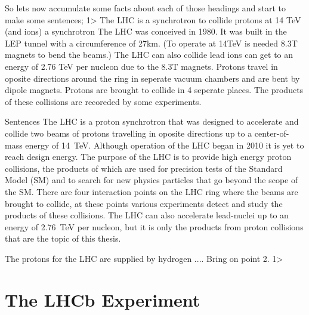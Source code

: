 So lets now accumulate some facts about each of those headings and start to make some sentences;
1> The LHC is a synchrotron to collide protons at 14 TeV (and ions)
a synchrotron 
The LHC was conceived in 1980.
It was built in the LEP tunnel with a circumference of 27km. (To operate at 14TeV is needed 8.3T magnets to bend the beams.)
The LHC can also collide lead ions can get to an energy of 2.76 TeV per nucleon due to the 8.3T magnets.
Protons travel in oposite directions around the ring in seperate vacuum chambers and are bent by dipole magnets.
Protons are brought to collide in 4 seperate places.
The products of these collisions are recoreded by some experiments.

Sentences
The LHC is a proton synchrotron that was designed to accelerate and collide two beams of protons travelling in oposite directions up to a center-of-mass energy of 14~TeV. Although operation of the LHC began in 2010 it is yet to reach design energy. The purpose of the LHC is to provide high energy proton collisions, the products of which are used for precision tests of the Standard Model (SM) and to search for new physics particles that go beyond the scope of the SM. There are four interaction points on the LHC ring where the beams are brought to collide, at these points various experiments detect and study the products of these collisions. The LHC can also accelerate lead-nuclei up to an energy of 2.76~TeV per nucleon, but it is only the products from proton collisions that are the topic of this thesis.


The protons for the LHC are supplied by hydrogen .... Bring on point 2.
1>


\section{The LHCb Experiment}
\label{LHCb}
